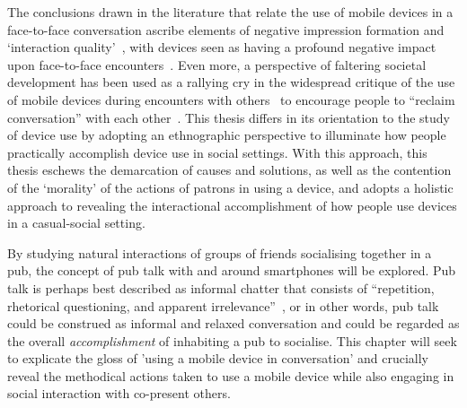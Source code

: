 \begin{revisedsubmission}
The conclusions drawn in the literature that relate the use of mobile devices in a face-to-face conversation ascribe elements of negative impression formation and `interaction quality'~\citep{VandenAbeele2016}, with devices seen as having a profound negative impact upon face-to-face encounters~\citep{Nakamura2015}.
Even more, a perspective of faltering societal development has been used as a rallying cry in the widespread critique of the use of mobile devices during encounters with others~\citep{Turkle2011} to encourage people to ``reclaim conversation'' with each other~\citep{Turkle2015}.
This thesis differs in its orientation to the study of device use by adopting an ethnographic perspective to illuminate how people practically accomplish device use in social settings.
With this approach, this thesis eschews the demarcation of causes and solutions, as well as the contention of the `morality' of the actions of patrons in using a device, and adopts a holistic approach to revealing the interactional accomplishment of how people use devices in a casual-social setting.

By studying natural interactions of groups of friends socialising together in a pub, the concept of pub talk with and around smartphones will be explored.
Pub talk is perhaps best described as informal chatter that consists of ``repetition, rhetorical questioning, and apparent irrelevance''~\citep[p. 241]{MassObservation1943}, or in other words, pub talk could be construed as informal and relaxed conversation and could be regarded as the overall \textit{accomplishment} of inhabiting a pub to socialise.
This chapter will seek to explicate the gloss of 'using a mobile device in conversation' and crucially reveal the methodical actions taken to use a mobile device while also engaging in social interaction with co-present others.
\end{revisedsubmission}

